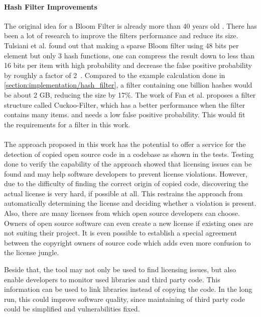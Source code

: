 \paragraph{Hash Filter Improvements}
The original idea for a Bloom Filter is already more than 40 years old \cite{bloom1970filter}.
There has been a lot of research to improve the filters performance and reduce its size.
Tulsiani et al. found out that \glqq making a sparse Bloom filter using 48 bits per element but only 3 hash functions, one can compress the result down to less than 16 bits per item with high probability and decrease the false positive probability by roughly a factor of 2\grqq \ \cite{tulsiani2013probability}.
Compared to the example calculation done in \autoref{section:implementation/hash_filter}, a filter containing one billion hashes would be about 2 GB, reducing the size by 17\%.
The work of Fan et al. proposes a filter structure called Cuckoo-Filter, which has a better performance when the filter contains many items. and needs a low false positive probability.
This would fit the requirements for a filter in this work.\\
\\
The approach proposed in this work has the potential to offer a service for the detection of copied open source code in a codebase as shown in the tests.
Testing done to verify the capability of the approach showed that licensing issues can be found and may help software developers to prevent license violations.
However, due to the difficulty of finding the correct origin of copied code, discovering the actual license is very hard, if possible at all.
This restrains the approach from automatically determining the license and deciding whether a violation is present.
Also, there are many licenses from which open source developers can choose.
Owners of open source software can even create a new license if existing ones are not suiting their project.
It is even possible to establish a special agreement between the copyright owners of source code which adds even more confusion to the license jungle.

Beside that, the tool may not only be used to find licensing issues, but also enable developers to monitor used libraries and third party code.
This information can be used to link libraries instead of copying the code.
In the long run, this could improve software quality, since maintaining of third party code could be simplified and vulnerabilities fixed.

